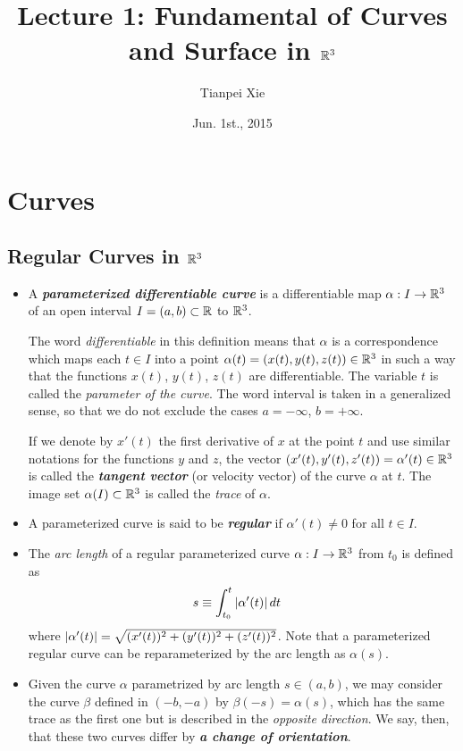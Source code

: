 \documentclass[11pt]{article}
\begin{document}
\title{Lecture 1: Fundamental of Curves and Surface in ${\mathbb R}^{3}$}
\author{ Tianpei Xie}
\date{ Jun. 1st., 2015 }
\maketitle
\tableofcontents
\newpage
\section{Curves}
\subsection{Regular Curves in ${\mathbb R}^3$}
\begin{itemize}
\item \begin{definition}
A \emph{\textbf{parameterized differentiable curve}} \citep{do1976differential} is a differentiable map $\alpha: I \rightarrow {\mathbb R}^{3}$ of an open interval $I = (a,b) \subset {\mathbb R}$ to ${\mathbb R}^{3}$. 
\end{definition}

The word \emph{differentiable} in this definition means that $\alpha$ is a correspondence which maps each $t \in I$ into a point $\alpha(t) = (x(t), y(t), z(t)) \in {\mathbb R}^3$ in such a way that the functions $x(t)$, $y(t)$, $z(t)$ are differentiable. The variable $t$ is called the \emph{parameter of the curve}. The word interval is taken in a generalized sense, so that we do not exclude the cases $a = -\infty$, $b = +\infty$.

If we denote by $x'(t)$ the first derivative of $x$ at the point $t$ and use similar notations for the functions $y$ and $z$, the vector $(x'(t), y'(t), z'(t)) = \alpha'(t) \in {\mathbb R}^3$ is called the \emph{\textbf{tangent vector}} (or velocity vector) of the curve $\alpha$ at $t$. The image set $\alpha(I) \subset {\mathbb R}^3$ is called the \emph{trace} of $\alpha$. 

\item \begin{definition}
A parameterized curve is said to be \emph{\textbf{regular}} if $\alpha'(t)\neq 0$ for all $t\in I$.
\end{definition}

\item The \emph{arc length} of a regular parameterized curve $\alpha: I \rightarrow {\mathbb R}^{3}$ from $t_{0}$ is defined as
\begin{align*}
s &\equiv \int_{t_{0}}^{t}\left\lvert \alpha'(t) \right\rvert dt 
\end{align*} where $\left\lvert \alpha'(t) \right\rvert = \sqrt{(x'(t))^{2} + (y'(t))^{2}+ (z'(t))^{2}}$. Note that a parameterized regular curve can be reparameterized by the arc length as $\alpha(s)$.

\item Given the curve $\alpha$ parametrized by arc length $s \in (a, b)$, we may consider the curve $\beta$ defined in $(-b, -a)$ by $\beta(-s) = \alpha(s)$, which has the same trace as the first one but is described in the \emph{opposite direction}. We say, then, that these two curves differ by \emph{\textbf{a change of orientation}}.
\end{itemize}
\end{document}
